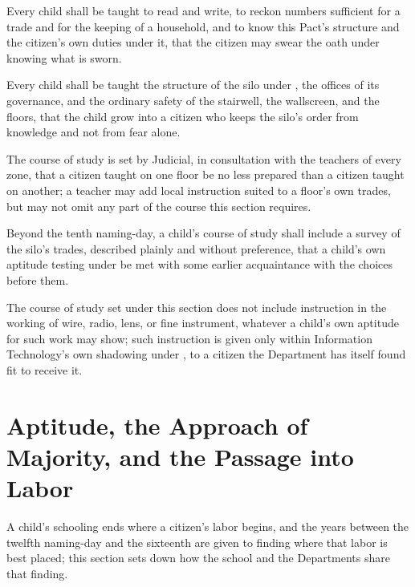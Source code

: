 \begin{clauses}
\item Every child shall be taught to read and write, to reckon numbers sufficient for a trade and for the keeping of a household, and to know this Pact's structure and the citizen's own duties under it, that the citizen may swear the oath under  knowing what is sworn.
\item Every child shall be taught the structure of the silo under , the offices of its governance, and the ordinary safety of the stairwell, the wallscreen, and the floors, that the child grow into a citizen who keeps the silo's order from knowledge and not from fear alone.
\item The course of study is set by Judicial, in consultation with the teachers of every zone, that a citizen taught on one floor be no less prepared than a citizen taught on another; a teacher may add local instruction suited to a floor's own trades, but may not omit any part of the course this section requires.
\item Beyond the tenth naming-day, a child's course of study shall include a survey of the silo's trades, described plainly and without preference, that a child's own aptitude testing under  be met with some earlier acquaintance with the choices before them.
\item The course of study set under this section does not include instruction in the working of wire, radio, lens, or fine instrument, whatever a child's own aptitude for such work may show; such instruction is given only within Information Technology's own shadowing under , to a citizen the Department has itself found fit to receive it.
\end{clauses}

\section{Aptitude, the Approach of Majority, and the Passage into Labor}
\label{sec:schooling:aptitude-the-approach-of-majority-and-the-passage-into-labor}

A child's schooling ends where a citizen's labor begins, and the years between the twelfth naming-day and the sixteenth are given to finding where that labor is best placed; this section sets down how the school and the Departments share that finding.


